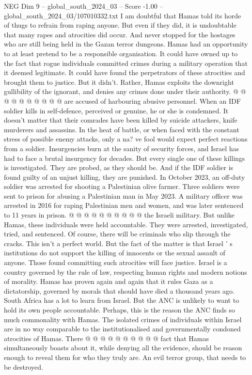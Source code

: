 \begin{textsample}{NEG Dim 9 – global\_south\_2024\_03 – Score -1.00 – global\_south\_2024\_03/107010332.txt}
I am doubtful that Hamas told its horde of thugs to refrain from raping anyone.
But even if they did, it is undoubtable that many rapes and atrocities did occur.
And never stopped for the hostages who are still being held in the Gazan terror dungeons.
Hamas had an opportunity to at least pretend to be a responsible organisation.
It could have owned up to the fact that rogue individuals committed crimes during a military operation that it deemed legitimate.
It could have found the perpetrators of these atrocities and brought them to justice.
But it didn't.
Rather, Hamas exploits the downright gullibility of the ignorant, and denies any crimes done under their authority. @ @ @ @ @ @ @ @ @ @ are accused of harbouring abusive personnel.
When an IDF soldier kills in self-defence, perceived or genuine, he or she is condemned.
It doesn't matter that their comrades have been killed by suicide attackers, knife murderers and assassins.
In the heat of battle, or when faced with the constant stress of possible enemy attacks, only a na? ve fool would expect perfect reactions from a soldier.
Insurgencies burn at the sanity of security forces, and Israel has had to face a brutal insurgency for decades.
But every single one of these killings is investigated.
They are probed, as they should be.
And if the IDF soldier is found guilty of an unjust killing, they are punished.
In October 2023, an off-duty soldier was arrested for shooting a Palestinian olive farmer.
Three soldiers were sent to prison for abusing a Palestinian man in May 2023.
A military officer was arrested in 2016 for raping Palestinian men and women, and was later sentenced to 11 years in prison. @ @ @ @ @ @ @ @ @ @ the Israeli military.
But unlike Hamas, these individuals were held accountable.
They were arrested, investigated, tried, and sentenced.
Of course, there will be criminals who slip through the cracks.
This isn't a perfect world.
But the fact of the matter is that Israel ' s institutions do not support the killing of innocents or the sexual assault of anyone.
Those found committing such atrocities will face justice.
Israel is a country governed by the rule of law, respecting human rights and modern notions of morality.
Hamas has proven again and again that it rules Gaza as a dictatorship, governed by morals that should have died a thousand years ago.
South Africa has a lot to learn from Israel.
But the ANC is unlikely to want to hold its own people accountable.
Perhaps, this is the reason the ANC finds so much commonality with Hamas.
The isolated crimes of individuals within Israel are in no way comparable to the institutionalised and governmentally condoned atrocities of Hamas.
There @ @ @ @ @ @ @ @ @ @ fact that Hamas simultaneously boasts about it, while denying all the evidence, should be reason enough to reveal them for who they truly are.
An evil terror group, that needs to be destroyed.

\end{textsample}
